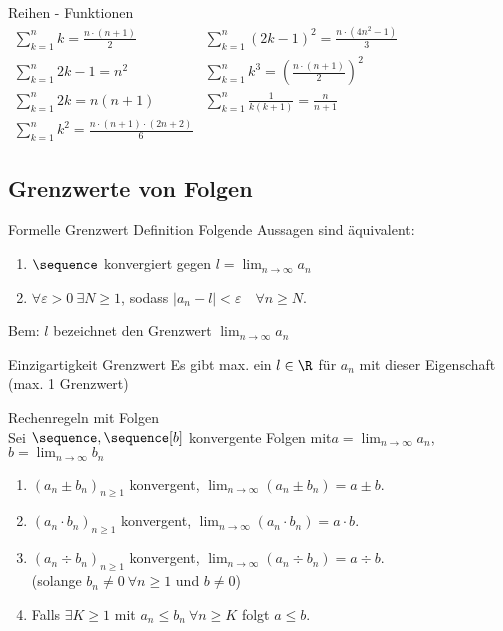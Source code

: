 \begin{definition}{Reihen - Funktionen}\\
  $
  \begin{array}{ll}
    \sum^{n}_{k=1} k = \frac{n \cdot (n+1)}{2} & \sum^{n}_{k=1} (2k - 1)^2 = \frac{n \cdot (4n^2-1)}{3}\\
    \sum^{n}_{k=1} 2k-1 = n^2 & \sum^{n}_{k=1} k^3 = \left( \frac{n \cdot (n+1)}{2}\right)^2\\
    \sum^{n}_{k=1} 2k = n(n+1) & \sum^{n}_{k=1} \frac{1}{k(k+1)} = \frac{n}{n+1}\\
    \sum^{n}_{k=1} k^2 = \frac{n \cdot (n+1) \cdot (2n+2)}{6} &
  \end{array}
  $
\end{definition}

\subsection{Grenzwerte von Folgen}

\begin{definition}{Formelle Grenzwert Definition}
  Folgende Aussagen sind äquivalent:
  \begin{enumerate}
    \item $\sequence$ konvergiert gegen $l = \lim_{n \to \infty} a_n$
    \item $\forall \varepsilon > 0~\exists N \geq 1$, sodass $|a_n -l | < \varepsilon \quad \forall n \geq N$.
  \end{enumerate}
\end{definition}

Bem: $l$ bezeichnet den Grenzwert $\lim_{n \to \infty} a_n$

\begin{lemma}{Einzigartigkeit Grenzwert}
  Es gibt max. ein $l \in \R$ für $a_n$ mit dieser Eigenschaft (max. 1 Grenzwert)
\end{lemma}

\begin{theorem}{Rechenregeln mit Folgen}\\
  Sei $\sequence,\sequence[b]$ konvergente Folgen mit$a = \lim_{n \to \infty} a_n$, $b = \lim_{n \to \infty} b_n$
  \begin{enumerate}
      \item $(a_n \pm b_n)_{n \geq 1}$ konvergent, $\lim_{n \to \infty} (a_n \pm b_n) = a \pm b$.
      \item $(a_n \cdot b_n)_{n \geq 1}$ konvergent, $\lim_{n \to \infty} (a_n \cdot b_n) = a \cdot b$.
      \item $(a_n \div  b_n)_{n \geq 1}$ konvergent, $\lim_{n \to \infty} (a_n \div b_n) = a \div b$.
      \\(solange $b_n \neq 0 ~ \forall n \geq 1$ und $b \neq 0$)
      \item Falls $\exists K \geq 1$ mit $a_n \leq b_n ~ \forall n \geq K$ folgt $a \leq b$.
  \end{enumerate}
\end{theorem}

